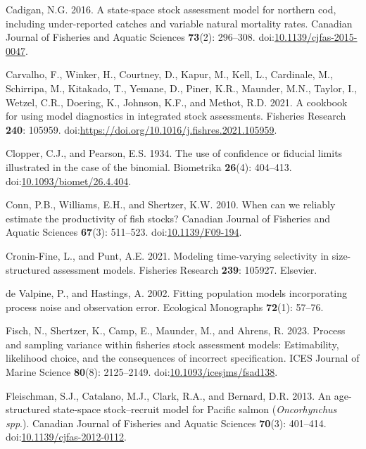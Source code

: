 \documentclass[
  12pt,
]{article}
\newlength{\cslhangindent}
\newlength{\cslentryspacingunit} %
\newenvironment{CSLReferences}[2] %
 {%
  \setlength{\parindent}{0pt}
  \ifodd #1
  \let\oldpar\par
  \def\par{\hangindent=\cslhangindent\oldpar}
  \fi
  \setlength{\parskip}{#2\cslentryspacingunit}
 }%
 {}
\begin{document}
\begin{CSLReferences}{1}{0}
\leavevmode{}%
Cadigan, N.G. 2016. A state-space stock assessment model for northern
cod, including under-reported catches and variable natural mortality
rates. Canadian Journal of Fisheries and Aquatic Sciences
\textbf{73}(2): 296--308.
doi:\href{https://doi.org/10.1139/cjfas-2015-0047}{10.1139/cjfas-2015-0047}.

\leavevmode{}%
Carvalho, F., Winker, H., Courtney, D., Kapur, M., Kell, L., Cardinale,
M., Schirripa, M., Kitakado, T., Yemane, D., Piner, K.R., Maunder, M.N.,
Taylor, I., Wetzel, C.R., Doering, K., Johnson, K.F., and Methot, R.D.
2021. A cookbook for using model diagnostics in integrated stock
assessments. Fisheries Research \textbf{240}: 105959.
doi:\url{https://doi.org/10.1016/j.fishres.2021.105959}.

\leavevmode{}%
Clopper, C.J., and Pearson, E.S. 1934. The use of confidence or fiducial
limits illustrated in the case of the binomial. Biometrika
\textbf{26}(4): 404--413.
doi:\href{https://doi.org/10.1093/biomet/26.4.404}{10.1093/biomet/26.4.404}.

\leavevmode{}%
Conn, P.B., Williams, E.H., and Shertzer, K.W. 2010. When can we
reliably estimate the productivity of fish stocks? Canadian Journal of
Fisheries and Aquatic Sciences \textbf{67}(3): 511--523.
doi:\href{https://doi.org/10.1139/F09-194}{10.1139/F09-194}.

\leavevmode{}%
Cronin-Fine, L., and Punt, A.E. 2021. Modeling time-varying selectivity
in size-structured assessment models. Fisheries Research \textbf{239}:
105927. Elsevier.

\leavevmode{}%
de Valpine, P., and Hastings, A. 2002. Fitting population models
incorporating process noise and observation error. Ecological Monographs
\textbf{72}(1): 57--76.

\leavevmode{}%
Fisch, N., Shertzer, K., Camp, E., Maunder, M., and Ahrens, R. 2023.
Process and sampling variance within fisheries stock assessment models:
Estimability, likelihood choice, and the consequences of incorrect
specification. ICES Journal of Marine Science \textbf{80}(8):
2125--2149.
doi:\href{https://doi.org/10.1093/icesjms/fsad138}{10.1093/icesjms/fsad138}.

\leavevmode{}%
Fleischman, S.J., Catalano, M.J., Clark, R.A., and Bernard, D.R. 2013.
An age-structured state-space stock--recruit model for {P}acific salmon
(\emph{{O}ncorhynchus spp}.). Canadian Journal of Fisheries and Aquatic
Sciences \textbf{70}(3): 401--414.
doi:\href{https://doi.org/10.1139/cjfas-2012-0112}{10.1139/cjfas-2012-0112}.


\end{CSLReferences}
\end{document}
